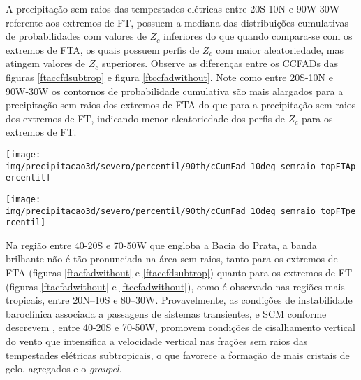 A precipitação sem raios das tempestades elétricas entre 20S-10N e 90W-30W referente aos extremos de FT, possuem a mediana das distribuições cumulativas de probabilidades com valores de $Z_c$ inferiores do que quando compara-se com os extremos de FTA, os quais possuem perfis de $Z_c$ com maior aleatoriedade, mas atingem valores de $Z_c$ superiores. Observe as diferenças entre os CCFADs das figuras \ref{ftaccfdsubtrop} e figura \ref{ftccfadwithout}. Note como entre 20S-10N e 90W-30W os contornos de probabilidade cumulativa são mais alargados para a precipitação sem raios dos extremos de FTA do que para a precipitação sem raios dos extremos de FT, indicando menor aleatoriedade dos perfis de $Z_c$ para os extremos de FT.

\begin{sidewaysfigure}%
  \centering
  \texttt{[image: img/precipitacao3d/severo/percentil/90th/cCumFad\_10deg\_semraio\_topFTApercentil]}
  \caption{CCFDs para os extremos de FTA. Porção da precipitação sem raios.}
  \label{ftaccfdsubtrop}   
\end{sidewaysfigure} 

\begin{sidewaysfigure}%
  \centering
  \texttt{[image: img/precipitacao3d/severo/percentil/90th/cCumFad\_10deg\_semraio\_topFTpercentil]}
  \caption{CCFDs para os extremos de FT. Porção da precipitação sem raios.}
  \label{ftccfadwithout}   
\end{sidewaysfigure} 


Na região entre 40-20S e 70-50W que engloba a Bacia do Prata, a banda brilhante não é tão pronunciada na área sem raios, tanto para os extremos de FTA (figuras \ref{ftacfadwithout} e \ref{ftaccfdsubtrop}) quanto para os extremos de FT (figuras \ref{ftacfadwithout} e \ref{ftccfadwithout}), como é observado nas regiões mais tropicais, entre 20N--10S e 80--30W. Provavelmente, as condições de instabilidade baroclínica associada a passagens de sistemas transientes, e SCM conforme descrevem , entre 40-20S e 70-50W, promovem condições de cisalhamento vertical do vento que intensifica a velocidade vertical nas frações sem raios das tempestades elétricas subtropicais, o que favorece a formação de mais cristais de gelo, agregados e o \textit{graupel}.

